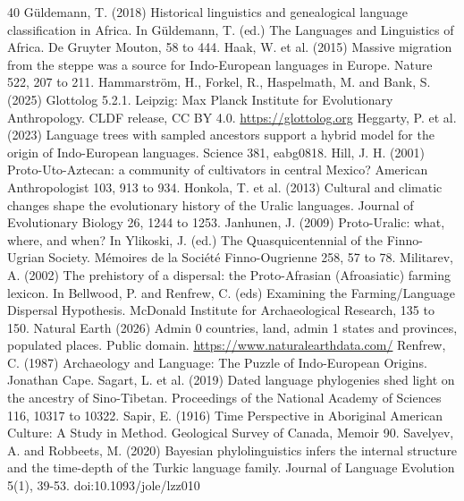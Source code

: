 \documentclass[11pt,a4paper]{article}
\begin{document}
\begin{thebibliography}{40}
 Güldemann, T. (2018) Historical linguistics and genealogical language classification in Africa. In Güldemann, T. (ed.) The Languages and Linguistics of Africa. De Gruyter Mouton, 58 to 444.
 Haak, W. et al. (2015) Massive migration from the steppe was a source for Indo-European languages in Europe. Nature 522, 207 to 211.
 Hammarström, H., Forkel, R., Haspelmath, M. and Bank, S. (2025) Glottolog 5.2.1. Leipzig: Max Planck Institute for Evolutionary Anthropology. CLDF release, CC BY 4.0. \url{https://glottolog.org}
 Heggarty, P. et al. (2023) Language trees with sampled ancestors support a hybrid model for the origin of Indo-European languages. Science 381, eabg0818.
 Hill, J. H. (2001) Proto-Uto-Aztecan: a community of cultivators in central Mexico? American Anthropologist 103, 913 to 934.
 Honkola, T. et al. (2013) Cultural and climatic changes shape the evolutionary history of the Uralic languages. Journal of Evolutionary Biology 26, 1244 to 1253.
 Janhunen, J. (2009) Proto-Uralic: what, where, and when? In Ylikoski, J. (ed.) The Quasquicentennial of the Finno-Ugrian Society. Mémoires de la Société Finno-Ougrienne 258, 57 to 78.
 Militarev, A. (2002) The prehistory of a dispersal: the Proto-Afrasian (Afroasiatic) farming lexicon. In Bellwood, P. and Renfrew, C. (eds) Examining the Farming/Language Dispersal Hypothesis. McDonald Institute for Archaeological Research, 135 to 150.
 Natural Earth (2026) Admin 0 countries, land, admin 1 states and provinces, populated places. Public domain. \url{https://www.naturalearthdata.com/}
 Renfrew, C. (1987) Archaeology and Language: The Puzzle of Indo-European Origins. Jonathan Cape.
 Sagart, L. et al. (2019) Dated language phylogenies shed light on the ancestry of Sino-Tibetan. Proceedings of the National Academy of Sciences 116, 10317 to 10322.
 Sapir, E. (1916) Time Perspective in Aboriginal American Culture: A Study in Method. Geological Survey of Canada, Memoir 90.
 Savelyev, A. and Robbeets, M. (2020) Bayesian phylolinguistics infers the internal structure and the time-depth of the Turkic language family. Journal of Language Evolution 5(1), 39-53. doi:10.1093/jole/lzz010

\end{thebibliography}
\end{document}

